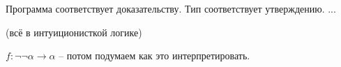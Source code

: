 \begin{definition}

    Программа соответствует доказательству. Тип соответствует утверждению. ...

    (всё в интуиционисткой логике)
\end{definition}

\begin{note}
    $f: \neg\neg \alpha \to \alpha $ -- потом подумаем как это интерпретировать.
\end{note}

\endinput
